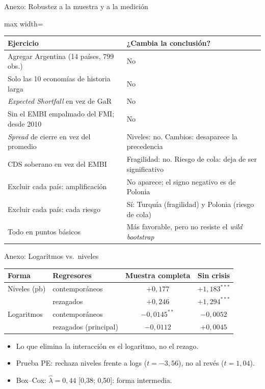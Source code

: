 \documentclass[aspectratio=169]{beamer}
\newcommand{\GaR}{\mathrm{GaR}}
\begin{document}
\begin{frame}{Anexo: Robustez a la muestra y a la medición}
\centering
\small
\begin{adjustbox}{max width=\textwidth}
\begin{tabular}{ll}
\toprule
Ejercicio & ¿Cambia la conclusión? \\
\midrule
Agregar Argentina (14 países, 799 obs.) & No \\
Solo las 10 economías de historia larga & No \\
\textit{Expected Shortfall} en vez de $\GaR$ & No \\
Sin el EMBI empalmado del FMI; desde 2010 & No \\
\textit{Spread} de cierre en vez del promedio & Niveles: no. Cambios: desaparece la precedencia \\
CDS soberano en vez del EMBI & Fragilidad: no. Riesgo de cola: deja de ser significativo \\
Excluir cada país: amplificación & No aparece; el signo negativo es de Polonia \\
Excluir cada país: cada riesgo & Sí: Turquía (fragilidad) y Polonia (riesgo de cola) \\
Todo en puntos básicos & Más favorable, pero no resiste el \textit{wild bootstrap} \\
\bottomrule
\end{tabular}
\end{adjustbox}
\end{frame}

\begin{frame}{Anexo: Logaritmos vs.\ niveles}
\centering
\footnotesize
\begin{tabular}{llcc}
\toprule
Forma & Regresores & Muestra completa & Sin crisis \\
\midrule
Niveles (pb) & contemporáneos & $+0{,}177$ & $+1{,}183^{***}$ \\
 & rezagados & $+0{,}246$ & $+1{,}294^{***}$ \\
\addlinespace
Logaritmos & contemporáneos & $-0{,}0145^{**}$ & $-0{,}0052$ \\
 & rezagados (principal) & $-0{,}0112$ & $+0{,}0045$ \\
\bottomrule
\end{tabular}
\vspace{6pt}
\begin{itemize}\footnotesize
\item Lo que elimina la interacción es el logaritmo, no el rezago.
\item Prueba PE: rechaza niveles frente a logs ($t=-3{,}56$), no al revés ($t=1{,}04$).
\item Box--Cox: $\hat\lambda=0{,}44$ [0,38; 0,50]: forma intermedia.
\end{itemize}
\end{frame}
\end{document}

